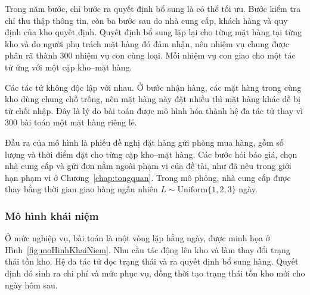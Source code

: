 Trong năm bước, chỉ bước ra quyết định bổ sung là có thể tối ưu. Bước kiểm tra chỉ thu thập thông tin, còn ba bước sau do nhà cung cấp, khách hàng và quy định của kho quyết định. Quyết định bổ sung lặp lại cho từng mặt hàng tại từng kho và do người phụ trách mặt hàng đó đảm nhận, nên nhiệm vụ chung được phân rã thành 300 nhiệm vụ con cùng loại. Mỗi nhiệm vụ con giao cho một tác tử ứng với một cặp kho--mặt hàng.

Các tác tử không độc lập với nhau. Ở bước nhận hàng, các mặt hàng trong cùng kho dùng chung chỗ trống, nên mặt hàng này đặt nhiều thì mặt hàng khác dễ bị từ chối nhập. Đây là lý do bài toán được mô hình hóa thành hệ đa tác tử thay vì 300 bài toán một mặt hàng riêng lẻ.


Đầu ra của mô hình là phiếu đề nghị đặt hàng gửi phòng mua hàng, gồm số lượng và thời điểm đặt cho từng cặp kho--mặt hàng. Các bước hỏi báo giá, chọn nhà cung cấp và gửi đơn nằm ngoài phạm vi của đề tài, như đã nêu trong giới hạn phạm vi ở Chương~\ref{chap:tongquan}. Trong mô phỏng, nhà cung cấp được thay bằng thời gian giao hàng ngẫu nhiên $L \sim \mathrm{Uniform}\{1, 2, 3\}$ ngày.

\subsubsection{Mô hình khái niệm}

Ở mức nghiệp vụ, bài toán là một vòng lặp hằng ngày, được minh họa ở Hình~\ref{fig:moHinhKhaiNiem}. Nhu cầu tác động lên kho và làm thay đổi trạng thái tồn kho. Hệ đa tác tử đọc trạng thái và ra quyết định bổ sung hàng. Quyết định đó sinh ra chi phí và mức phục vụ, đồng thời tạo trạng thái tồn kho mới cho ngày hôm sau.


